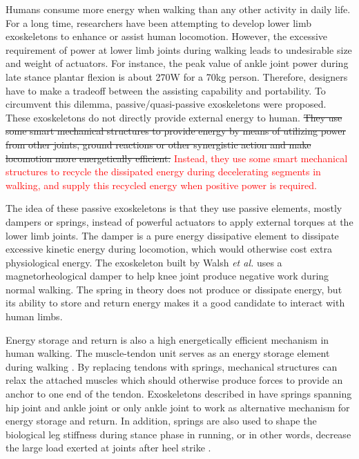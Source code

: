 \documentclass[twocolumn,cleanfoot,10pt]{asme2ej}
\begin{document}
Humans consume more energy when walking than any other activity in daily life.
For a long time, researchers have been attempting to develop lower limb exoskeletons to enhance or assist human locomotion.
However, the excessive requirement of power at lower limb joints during walking leads to undesirable size and weight of actuators\cite{RN1}.
For instance, the peak value of ankle joint power during late stance plantar flexion is about 270W for a 70kg person\cite{RN2}.
Therefore, designers have to make a tradeoff between the assisting capability and portability.
To circumvent this dilemma, passive/quasi-passive exoskeletons were proposed\cite{RN3}.
These exoskeletons do not directly provide external energy to human.
\sout{They use some smart mechanical structures to provide energy by means of utilizing power from other joints, ground reactions or other synergistic action and make locomotion more energetically efficient.}
\textcolor{red}{Instead, they use some smart mechanical structures to recycle the dissipated energy during decelerating segments in walking, and supply this recycled energy when positive power is required.}

The idea of these passive exoskeletons is that they use passive elements, mostly dampers or springs, instead of powerful actuators to apply external torques at the lower limb joints.
The damper is a pure energy dissipative element to dissipate excessive kinetic energy during locomotion, which would otherwise cost extra physiological energy\cite{negativework}.
The exoskeleton built by Walsh \emph{et al.} uses a magnetorheological damper to help knee joint produce negative work during normal walking\cite{RN3}.
The spring in theory does not produce or dissipate energy, but its ability to store and return energy makes it a good candidate to interact with human limbs. 

Energy storage and return is also a high energetically efficient mechanism in human walking.
The muscle-tendon unit serves as an energy storage element during walking \cite{RN16}\cite{pays}.
By replacing tendons with springs, mechanical structures can relax the attached muscles which should otherwise produce forces to provide an anchor to one end of the tendon.
Exoskeletons described in \cite{RN3}\cite{RN4}\cite{RN5} have springs spanning hip joint and ankle joint or only ankle joint to work as alternative mechanism for energy storage and return.
In addition, springs are also used to shape the biological leg stiffness during stance phase in running, or in other words, decrease the large load exerted at joints after heel strike \cite{RN6,RN7,RN8}.
\end{document}
